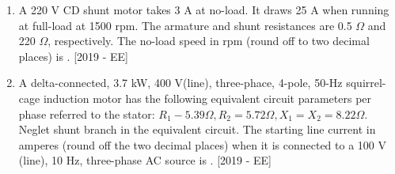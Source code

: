 \documentclass[journal]{IEEEtran}
\begin{document}
\begin{enumerate}
\item A 220 V CD shunt motor takes 3 A at no-load. It draws 25 A when running at full-load at 1500 rpm. The armature and shunt resistances are 0.5 $\Omega$ and 220 $\Omega$, respectively. The no-load speed in rpm (round off to two decimal places) is \underline{\hspace{3cm}}. \hfill{[2019 - EE]}
\item A delta-connected, 3.7 kW, 400 V(line), three-phace, 4-pole, 50-Hz squirrel-cage induction motor has the following equivalent circuit parameters per phase referred to the stator: $R_1 - 5.39 \Omega, R_2 = 5.72 \Omega, X_1 = X_2 = 8.22 \Omega$. Neglet shunt branch in the equivalent circuit. The starting line current in amperes (round off the two decimal places) when it is connected to a 100 V (line), 10 Hz, three-phase AC source is \underline{\hspace{3cm}}. \hfill{[2019 - EE]}


\end{enumerate}
\end{document}
